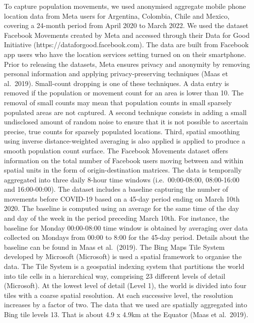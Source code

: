 \documentclass[
  11pt,
]{article}
\begin{document}
To capture population movements, we used anonymised aggregate mobile
phone location data from Meta users for Argentina, Colombia, Chile and
Mexico, covering a 24-month period from April 2020 to March 2022. We
used the dataset Facebook Movements created by Meta and accessed through
their Data for Good Initiative (https://dataforgood.facebook.com). The
data are built from Facebook app users who have the location services
setting turned on on their smartphone. Prior to releasing the datasets,
Meta ensures privacy and anonymity by removing personal information and
applying privacy-preserving techniques (Maas et al.~2019). Small-count
dropping is one of these techniques. A data entry is removed if the
population or movement count for an area is lower than 10. The removal
of small counts may mean that population counts in small sparsely
populated areas are not captured. A second technique consists in adding
a small undisclosed amount of random noise to ensure that it is not
possible to ascertain precise, true counts for sparsely populated
locations. Third, spatial smoothing using inverse distance-weighted
averaging is also applied is applied to produce a smooth population
count surface. The Facebook Movements dataset offers information on the
total number of Facebook users moving between and within spatial units
in the form of origin-destination matrices. The data is temporally
aggregated into three daily 8-hour time windows (i.e.~00:00-08:00,
08:00-16:00 and 16:00-00:00). The dataset includes a baseline capturing
the number of movements before COVID-19 based on a 45-day period ending
on March 10th 2020. The baseline is computed using an average for the
same time of the day and day of the week in the period preceding March
10th. For instance, the baseline for Monday 00:00-08:00 time window is
obtained by averaging over data collected on Mondays from 00:00 to 8:00
for the 45-day period. Details about the baseline can be found in Maas
et al.~(2019). The Bing Maps Tile System developed by Microsoft
(Microsoft) is used a spatial framework to organise the data. The Tile
System is a geospatial indexing system that partitions the world into
tile cells in a hierarchical way, comprising 23 different levels of
detail (Microsoft). At the lowest level of detail (Level 1), the world
is divided into four tiles with a coarse spatial resolution. At each
successive level, the resolution increases by a factor of two. The data
that we used are spatially aggregated into Bing tile levels 13. That is
about 4.9 x 4.9km at the Equator (Maas et al.~2019).
\end{document}
